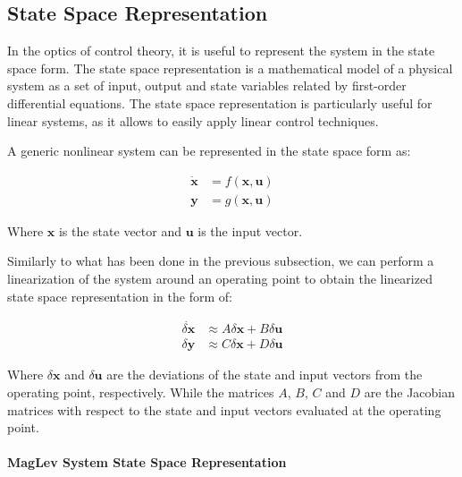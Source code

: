 \subsection{State Space Representation}
\label{subsec:state_space_representation}

In the optics of control theory, it is useful to represent the system in the state space form.
The state space representation is a mathematical model of a physical system as a set of input, output and state variables related by first-order differential equations.
The state space representation is particularly useful for linear systems, as it allows to easily apply linear control techniques.

A generic nonlinear system can be represented in the state space form as:

\begin{equation}
    \begin{aligned}
        \dot{\mathbf{x}} & = f(\mathbf{x}, \mathbf{u}) \\
        \mathbf{y}       & = g(\mathbf{x}, \mathbf{u})
    \end{aligned}
\end{equation}

Where $\mathbf{x}$ is the state vector and $\mathbf{u}$ is the input vector.

Similarly to what has been done in the previous subsection, we can perform a linearization of the system around an operating point to obtain the linearized state space representation in the form of:

\begin{equation}
    \begin{aligned}
        \dot{\delta\mathbf{x}} & \approx A \delta\mathbf{x} + B \delta\mathbf{u} \\
        \delta\mathbf{y}       & \approx C \delta\mathbf{x} + D \delta\mathbf{u}
    \end{aligned}
\end{equation}

Where $\delta\mathbf{x}$ and $\delta\mathbf{u}$ are the deviations of the state and input vectors from the operating point, respectively.
While the matrices $A$, $B$, $C$ and $D$ are the Jacobian matrices with respect to the state and input vectors evaluated at the operating point.

\paragraph{MagLev System State Space Representation}

